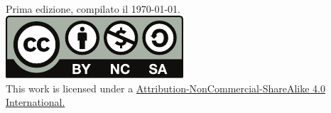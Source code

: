 \newpage
\thispagestyle{empty}
~\vfill
\begin{center}
	Prima edizione, compilato il \today.\\
			\includegraphics[trim=0cm 0cm 0cm 0cm,clip,scale=0.5]{images/Cc-by-nc-sa_icon.pdf}\\
	{\footnotesize This work is licensed under a \href{https://creativecommons.org/licenses/by-sa/4.0/}{Attribution-NonCommercial-ShareAlike 4.0 International.}}
\end{center}
\newpage
%
